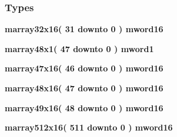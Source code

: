 \subsubsection*{Types}
 \begin{DoxyCompactItemize}
\item 
{\bfseries {\bf marray32x16}{\bfseries \textcolor{vhdlchar}{(}\textcolor{vhdlchar}{ }\textcolor{vhdlchar}{ } \textcolor{vhdldigit}{31} \textcolor{vhdlchar}{ }\textcolor{keywordflow}{downto}\textcolor{vhdlchar}{ }\textcolor{vhdlchar}{ } \textcolor{vhdldigit}{0} \textcolor{vhdlchar}{ }\textcolor{vhdlchar}{)}\textcolor{vhdlchar}{ }\textcolor{vhdlchar}{ }{\bfseries {\bf mword16}} \textcolor{vhdlchar}{ }}} 
\item 
{\bfseries {\bf marray48x1}{\bfseries \textcolor{vhdlchar}{(}\textcolor{vhdlchar}{ }\textcolor{vhdlchar}{ } \textcolor{vhdldigit}{47} \textcolor{vhdlchar}{ }\textcolor{keywordflow}{downto}\textcolor{vhdlchar}{ }\textcolor{vhdlchar}{ } \textcolor{vhdldigit}{0} \textcolor{vhdlchar}{ }\textcolor{vhdlchar}{)}\textcolor{vhdlchar}{ }\textcolor{vhdlchar}{ }{\bfseries {\bf mword1}} \textcolor{vhdlchar}{ }}} 
\item 
{\bfseries {\bf marray47x16}{\bfseries \textcolor{vhdlchar}{(}\textcolor{vhdlchar}{ }\textcolor{vhdlchar}{ } \textcolor{vhdldigit}{46} \textcolor{vhdlchar}{ }\textcolor{keywordflow}{downto}\textcolor{vhdlchar}{ }\textcolor{vhdlchar}{ } \textcolor{vhdldigit}{0} \textcolor{vhdlchar}{ }\textcolor{vhdlchar}{)}\textcolor{vhdlchar}{ }\textcolor{vhdlchar}{ }{\bfseries {\bf mword16}} \textcolor{vhdlchar}{ }}} 
\item 
{\bfseries {\bf marray48x16}{\bfseries \textcolor{vhdlchar}{(}\textcolor{vhdlchar}{ }\textcolor{vhdlchar}{ } \textcolor{vhdldigit}{47} \textcolor{vhdlchar}{ }\textcolor{keywordflow}{downto}\textcolor{vhdlchar}{ }\textcolor{vhdlchar}{ } \textcolor{vhdldigit}{0} \textcolor{vhdlchar}{ }\textcolor{vhdlchar}{)}\textcolor{vhdlchar}{ }\textcolor{vhdlchar}{ }{\bfseries {\bf mword16}} \textcolor{vhdlchar}{ }}} 
\item 
{\bfseries {\bf marray49x16}{\bfseries \textcolor{vhdlchar}{(}\textcolor{vhdlchar}{ }\textcolor{vhdlchar}{ } \textcolor{vhdldigit}{48} \textcolor{vhdlchar}{ }\textcolor{keywordflow}{downto}\textcolor{vhdlchar}{ }\textcolor{vhdlchar}{ } \textcolor{vhdldigit}{0} \textcolor{vhdlchar}{ }\textcolor{vhdlchar}{)}\textcolor{vhdlchar}{ }\textcolor{vhdlchar}{ }{\bfseries {\bf mword16}} \textcolor{vhdlchar}{ }}} 
\item 
{\bfseries {\bf marray512x16}{\bfseries \textcolor{vhdlchar}{(}\textcolor{vhdlchar}{ }\textcolor{vhdlchar}{ } \textcolor{vhdldigit}{511} \textcolor{vhdlchar}{ }\textcolor{keywordflow}{downto}\textcolor{vhdlchar}{ }\textcolor{vhdlchar}{ } \textcolor{vhdldigit}{0} \textcolor{vhdlchar}{ }\textcolor{vhdlchar}{)}\textcolor{vhdlchar}{ }\textcolor{vhdlchar}{ }{\bfseries {\bf mword16}} \textcolor{vhdlchar}{ }}} 

\end{DoxyCompactItemize}
